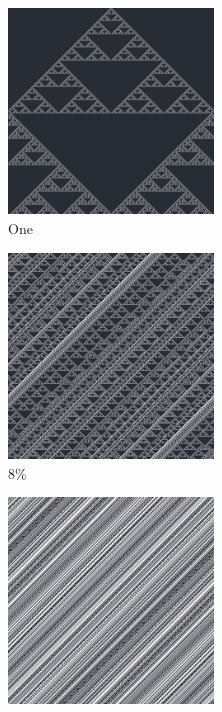 \documentclass[12pt, fleqn]{report}                             %
\theoremstyle{break}                                            %
\begin{document}
      \begin{figure}[ht!]
        \centering
        \begin{subfigure}[b]{0.4\linewidth}
          \includegraphics[width=0.6\textwidth]{Images/154/a.png}
          \caption{One}
        \end{subfigure}
        \begin{subfigure}[b]{0.4\linewidth}
          \includegraphics[width=0.6\textwidth]{Images/154/b.png}
          \caption{8\%}
        \end{subfigure}
        \begin{subfigure}[b]{0.4\linewidth}
          \includegraphics[width=0.6\textwidth]{Images/154/c.png}

\end{subfigure}
\end{figure}
\end{document}
